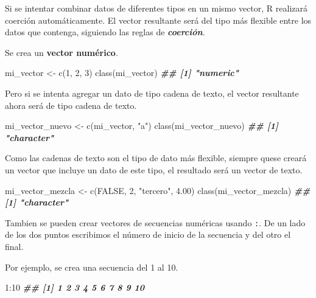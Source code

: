 \documentclass[
]{book}
\newenvironment{Shaded}{\begin{snugshade}}{\end{snugshade}}
\newcommand{\ConstantTok}[1]{\textcolor[rgb]{0.00,0.00,0.00}{#1}}
\newcommand{\DecValTok}[1]{\textcolor[rgb]{0.00,0.00,0.81}{#1}}
\newcommand{\DocumentationTok}[1]{\textcolor[rgb]{0.56,0.35,0.01}{\textbf{\textit{#1}}}}
\newcommand{\FloatTok}[1]{\textcolor[rgb]{0.00,0.00,0.81}{#1}}
\newcommand{\FunctionTok}[1]{\textcolor[rgb]{0.00,0.00,0.00}{#1}}
\newcommand{\NormalTok}[1]{#1}
\newcommand{\OtherTok}[1]{\textcolor[rgb]{0.56,0.35,0.01}{#1}}
\newcommand{\SpecialCharTok}[1]{\textcolor[rgb]{0.00,0.00,0.00}{#1}}
\newcommand{\StringTok}[1]{\textcolor[rgb]{0.31,0.60,0.02}{#1}}
\begin{document}
Si se intentar combinar datos de diferentes tipos en un mismo vector, R realizará coerción automáticamente. El vector resultante será del tipo más flexible entre los datos que contenga, siguiendo las reglas de \textbf{\emph{coerción}}.

Se crea un \textbf{vector numérico}.

\begin{Shaded}
\begin{Highlighting}[]
\NormalTok{mi\_vector }\OtherTok{\textless{}{-}} \FunctionTok{c}\NormalTok{(}\DecValTok{1}\NormalTok{, }\DecValTok{2}\NormalTok{, }\DecValTok{3}\NormalTok{)}
\FunctionTok{class}\NormalTok{(mi\_vector)}
\DocumentationTok{\#\# [1] "numeric"}
\end{Highlighting}
\end{Shaded}

Pero si se intenta agregar un dato de tipo cadena de texto, el vector resultante ahora será de tipo cadena de texto.

\begin{Shaded}
\begin{Highlighting}[]
\NormalTok{mi\_vector\_nuevo }\OtherTok{\textless{}{-}} \FunctionTok{c}\NormalTok{(mi\_vector, }\StringTok{"a"}\NormalTok{)}
\FunctionTok{class}\NormalTok{(mi\_vector\_nuevo)}
\DocumentationTok{\#\# [1] "character"}
\end{Highlighting}
\end{Shaded}

Como las cadenas de texto son el tipo de dato más flexible, siempre quese creará un vector que incluye un dato de este tipo, el resultado será un vector de texto.

\begin{Shaded}
\begin{Highlighting}[]
\NormalTok{mi\_vector\_mezcla }\OtherTok{\textless{}{-}} \FunctionTok{c}\NormalTok{(}\ConstantTok{FALSE}\NormalTok{, }\DecValTok{2}\NormalTok{, }\StringTok{"tercero"}\NormalTok{, }\FloatTok{4.00}\NormalTok{)}
\FunctionTok{class}\NormalTok{(mi\_vector\_mezcla)}
\DocumentationTok{\#\# [1] "character"}
\end{Highlighting}
\end{Shaded}

Tambien se pueden crear vectores de secuencias numéricas usando \texttt{:}. De un lado de los dos puntos escribimos el número de inicio de la secuencia y del otro el final.

Por ejemplo, se crea una secuencia del 1 al 10.

\begin{Shaded}
\begin{Highlighting}[]
\DecValTok{1}\SpecialCharTok{:}\DecValTok{10}
\DocumentationTok{\#\#  [1]  1  2  3  4  5  6  7  8  9 10}
\end{Highlighting}
\end{Shaded}
\end{document}
